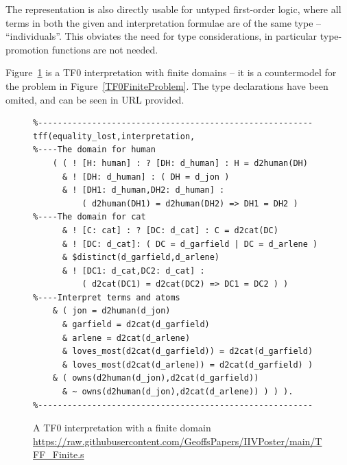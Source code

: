 \documentclass[letterpaper]{article}
\begin{document}
{%
The representation is also directly usable for untyped first-order logic, where all terms 
in both the given and interpretation formulae 
are of the same type -- ``individuals''. 
This obviates the need for type considerations, in particular type-promotion functions are not 
needed.
 
Figure~\ref{TF0FiniteInterpretation} is a TF0 interpretation with finite domains -- it is a 
countermodel for the problem in Figure~\ref{TF0FiniteProblem}.
The type declarations have been omited, and can be seen in URL provided.

\begin{figure}[htbp]
\scriptsize
{}
\begin{verbatim}
%--------------------------------------------------------
tff(equality_lost,interpretation,
%----The domain for human
    ( ( ! [H: human] : ? [DH: d_human] : H = d2human(DH)
      & ! [DH: d_human] : ( DH = d_jon )
      & ! [DH1: d_human,DH2: d_human] :
          ( d2human(DH1) = d2human(DH2) => DH1 = DH2 )
%----The domain for cat
      & ! [C: cat] : ? [DC: d_cat] : C = d2cat(DC)
      & ! [DC: d_cat]: ( DC = d_garfield | DC = d_arlene )
      & $distinct(d_garfield,d_arlene)
      & ! [DC1: d_cat,DC2: d_cat] :
          ( d2cat(DC1) = d2cat(DC2) => DC1 = DC2 ) )
%----Interpret terms and atoms
    & ( jon = d2human(d_jon)
      & garfield = d2cat(d_garfield)
      & arlene = d2cat(d_arlene)
      & loves_most(d2cat(d_garfield)) = d2cat(d_garfield)
      & loves_most(d2cat(d_arlene)) = d2cat(d_garfield) )
    & ( owns(d2human(d_jon),d2cat(d_garfield))
      & ~ owns(d2human(d_jon),d2cat(d_arlene)) ) ) ).
%--------------------------------------------------------
\end{verbatim}
\caption{A TF0 interpretation with a finite domain \\
{\scriptsize \url{https://raw.githubusercontent.com/GeoffsPapers/IIVPoster/main/TFF_Finite.s}}}
\label{TF0FiniteInterpretation}
\end{figure}

}
\end{document}

